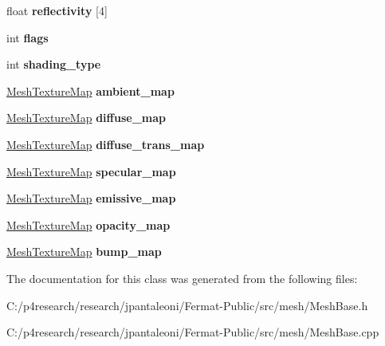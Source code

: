\begin{DoxyCompactItemize}
float {\bfseries reflectivity} \mbox{[}4\mbox{]}
\item 
\mbox{\label{class_mesh_material_params_a65eb6d2e55f07a17f631d84cd61c8761}} 
int {\bfseries flags}
\item 
\mbox{\label{class_mesh_material_params_a65c88f514165090d87a507491cd06bfc}} 
int {\bfseries shading\+\_\+type}
\item 
\mbox{\label{class_mesh_material_params_aca6ee65a23aecb70ce6b068eb3b14332}} 
\hyperlink{class_mesh_texture_map}{Mesh\+Texture\+Map} {\bfseries ambient\+\_\+map}
\item 
\mbox{\label{class_mesh_material_params_a03a71de3e909e99167aa21fe9bf03cde}} 
\hyperlink{class_mesh_texture_map}{Mesh\+Texture\+Map} {\bfseries diffuse\+\_\+map}
\item 
\mbox{\label{class_mesh_material_params_a060130e71094567ec4bf0b1f0b793acc}} 
\hyperlink{class_mesh_texture_map}{Mesh\+Texture\+Map} {\bfseries diffuse\+\_\+trans\+\_\+map}
\item 
\mbox{\label{class_mesh_material_params_aa9dfbbf47e5769ebc289e2c815a22219}} 
\hyperlink{class_mesh_texture_map}{Mesh\+Texture\+Map} {\bfseries specular\+\_\+map}
\item 
\mbox{\label{class_mesh_material_params_a62ee8ca76ff9e6081cfd3182cc677fa1}} 
\hyperlink{class_mesh_texture_map}{Mesh\+Texture\+Map} {\bfseries emissive\+\_\+map}
\item 
\mbox{\label{class_mesh_material_params_ab9802e81abbe543096667058e152d8e9}} 
\hyperlink{class_mesh_texture_map}{Mesh\+Texture\+Map} {\bfseries opacity\+\_\+map}
\item 
\mbox{\label{class_mesh_material_params_a15cdbcf29def76a52287f7e6651df53f}} 
\hyperlink{class_mesh_texture_map}{Mesh\+Texture\+Map} {\bfseries bump\+\_\+map}
\end{DoxyCompactItemize}


The documentation for this class was generated from the following files\+:\begin{DoxyCompactItemize}
\item 
C\+:/p4research/research/jpantaleoni/\+Fermat-\/\+Public/src/mesh/Mesh\+Base.\+h\item 
C\+:/p4research/research/jpantaleoni/\+Fermat-\/\+Public/src/mesh/Mesh\+Base.\+cpp\end{DoxyCompactItemize}
